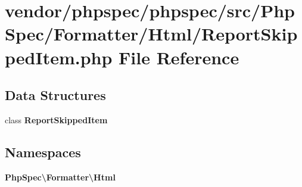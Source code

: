 \section{vendor/phpspec/phpspec/src/\+Php\+Spec/\+Formatter/\+Html/\+Report\+Skipped\+Item.php File Reference}
\label{_report_skipped_item_8php}
\subsection*{Data Structures}
\begin{DoxyCompactItemize}
\item 
class {\bf Report\+Skipped\+Item}
\end{DoxyCompactItemize}
\subsection*{Namespaces}
\begin{DoxyCompactItemize}
\item 
 {\bf Php\+Spec\textbackslash{}\+Formatter\textbackslash{}\+Html}
\end{DoxyCompactItemize}
